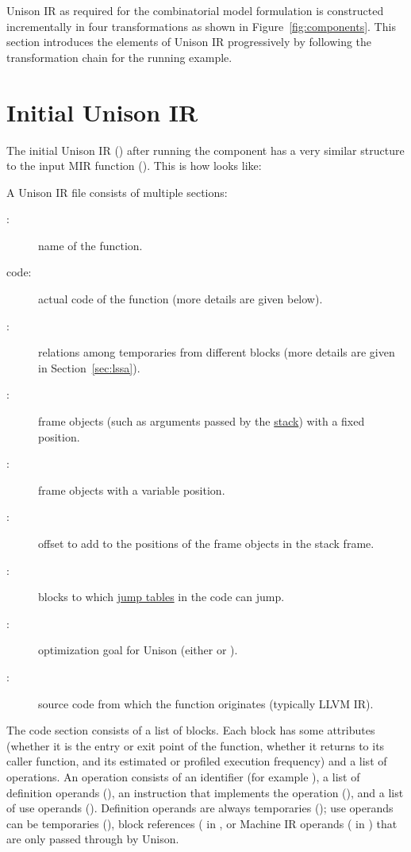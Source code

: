 \documentclass[11pt]{report}
\newenvironment{colorBox}[1]
 {\begin{tcolorbox}[
    breakable,
    colback=#1,
    colframe=white,
    boxrule=0pt
  ]}
 {\end{tcolorbox}}
\newenvironment{codeBox}
 {\begin{colorBox}{bgcolor4!20}}
 {\end{colorBox}}
\begin{document}
Unison IR as required for the combinatorial model formulation is constructed
incrementally in four transformations as shown in Figure~\ref{fig:components}.
%
This section introduces the elements of Unison IR progressively by following the
transformation chain for the running example.

\section{Initial Unison IR}

The initial Unison IR () after running the 
component has a very similar structure to the input MIR function ().
%
This is how  looks like:

\begin{codeBox}
\end{codeBox}

A Unison IR file consists of multiple sections:

\begin{description}
\item [:] name of the function.
\item [code:] actual code of the function (more details are given below).
\item [:] relations among temporaries from different blocks (more
  details are given in Section~\ref{sec:lssa}).
\item [:] frame objects (such as arguments passed by the
  \href{https://en.wikipedia.org/wiki/Call_stack}{stack}) with a fixed position.
\item [:] frame objects with a variable position.
\item [:] offset to add to the positions of the frame
  objects in the stack frame.
\item [:] blocks to which
  \href{https://en.wikipedia.org/wiki/Branch_table}{jump tables} in the code can
  jump.
\item [:] optimization goal for Unison (either  or
  ).
\item [:] source code from which the function originates (typically
  LLVM IR).
\end{description}

The code section consists of a list of blocks.
%
Each block has some attributes (whether it is the entry or exit point of the
function, whether it returns to its caller function, and its estimated or
profiled execution frequency) and a list of operations.
%
An operation consists of an identifier (for example ), a list of
definition operands (\code{[t6]}), an instruction that implements the operation
(), and a list of use operands (\code{[t5, -1]}).
%
Definition operands are always temporaries (); use operands can be
temporaries (), block references ( in , or Machine IR
operands ( in ) that are only passed through by Unison.
\end{document}
